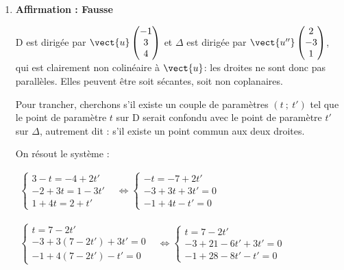 \begin{enumerate}
Ici, on peut cependant adopter une \textbf{méthode différente} : on repère que les trois points A, B et C partagent la même ordonnée : 3, et sont réputés non alignés, donc le plan ABC est le plan d'équation $y = 3$, et un vecteur normal à (ABC) est le vecteur $\vect{j}$. Comme $\vect{j}$ est clairement non colinéaire à $\vect{u}$, alors on peut en déduire que D n'est pas orthogonale à (ABC).
\item \textbf{Affirmation : Fausse}

D est dirigée par $\vect{u}\begin{pmatrix}-1\\3\\4\end{pmatrix}$ et $\Delta$ est dirigée par $\vect{u''} \begin{pmatrix}2\\-3\\1\end{pmatrix}$, qui est clairement non colinéaire à $\vect{u}$: les droites ne sont donc pas parallèles. Elles peuvent être soit sécantes, soit non coplanaires.

Pour trancher, cherchons s'il existe un couple de paramètres $(t~;~t')$ tel que le point de paramètre $t$ sur D serait confondu avec le point de paramètre $t'$ sur $\Delta$, autrement dit : s'il existe un point commun aux deux droites.

On résout le système :

$\begin{aligned}
\begin{cases}
3-t = -4+2t'\\
-2+3t = 1 - 3t'\\
1+4t = 2+t'
\end{cases} &\iff
\begin{cases}
-t = -7+2t'\\
-3+3t+3t' = 0\\
-1+4t-t' = 0
\end{cases}
\end{aligned}$

$\begin{aligned}
\begin{cases}
t = 7-2t'\\
-3+3(7-2t')+3t' = 0\\
-1+4(7-2t')-t' = 0
\end{cases}
 &\iff
\begin{cases}
t = 7-2t'\\
-3 + 21 - 6t'+3t'=0\\
-1+28-8t'-t' = 0
\end{cases}\\
\end{aligned}$


\end{enumerate}
